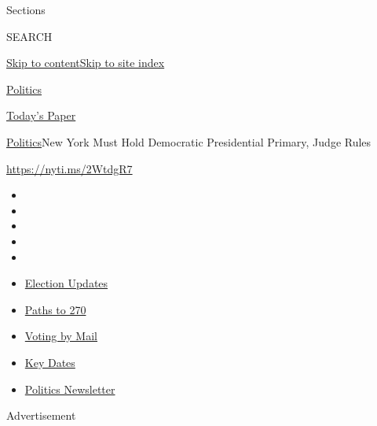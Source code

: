 Sections

SEARCH

\protect\hyperlink{site-content}{Skip to
content}\protect\hyperlink{site-index}{Skip to site index}

\href{https://www.nytimes3xbfgragh.onion/section/politics}{Politics}

\href{https://myaccount.nytimes3xbfgragh.onion/auth/login?response_type=cookie\&client_id=vi}{}

\href{https://www.nytimes3xbfgragh.onion/section/todayspaper}{Today's
Paper}

\href{/section/politics}{Politics}\textbar{}New York Must Hold
Democratic Presidential Primary, Judge Rules

\url{https://nyti.ms/2WtdgR7}

\begin{itemize}
\item
\item
\item
\item
\item
\end{itemize}

\begin{itemize}
\item
  \href{https://www.nytimes3xbfgragh.onion/live/2020/09/07/us/trump-vs-biden?action=click\&pgtype=Article\&state=default\&region=TOP_BANNER\&context=storylines_menu}{Election
  Updates}
\item
  \href{https://www.nytimes3xbfgragh.onion/interactive/2020/us/elections/election-states-biden-trump.html?action=click\&pgtype=Article\&state=default\&region=TOP_BANNER\&context=storylines_menu}{Paths
  to 270}
\item
  \href{https://www.nytimes3xbfgragh.onion/interactive/2020/08/31/us/politics/vote-by-mail-deadlines.html?action=click\&pgtype=Article\&state=default\&region=TOP_BANNER\&context=storylines_menu}{Voting
  by Mail}
\item
  \href{https://www.nytimes3xbfgragh.onion/interactive/2019/us/elections/2020-presidential-election-calendar.html?action=click\&pgtype=Article\&state=default\&region=TOP_BANNER\&context=storylines_menu}{Key
  Dates}
\item
  \href{https://www.nytimes3xbfgragh.onion/newsletters/politics?action=click\&pgtype=Article\&state=default\&region=TOP_BANNER\&context=storylines_menu}{Politics
  Newsletter}
\end{itemize}

Advertisement

